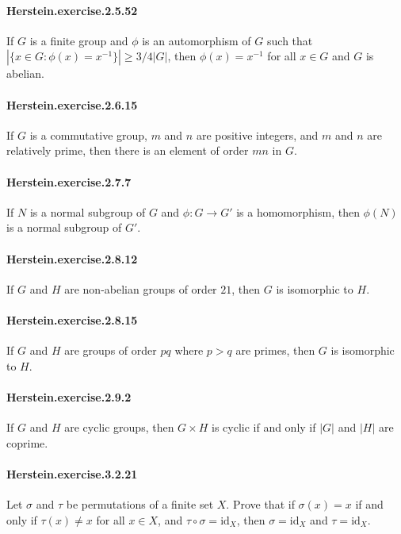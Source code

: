 \documentclass{article}
\begin{document}
\paragraph{Herstein.exercise.2.5.52} If $G$ is a finite group and $\phi$ is an automorphism of $G$ such that $|\{x\in G: \phi(x)=x^{-1}\}|\geq 3/4|G|$, then $\phi(x)=x^{-1}$ for all $x\in G$ and $G$ is abelian.

\paragraph{Herstein.exercise.2.6.15} If $G$ is a commutative group, $m$ and $n$ are positive integers, and $m$ and $n$ are relatively prime, then there is an element of order $mn$ in $G$.

\paragraph{Herstein.exercise.2.7.7} If $N$ is a normal subgroup of $G$ and $\phi:G\to G'$ is a homomorphism, then $\phi(N)$ is a normal subgroup of $G'$.

\paragraph{Herstein.exercise.2.8.12} If $G$ and $H$ are non-abelian groups of order $21$, then $G$ is isomorphic to $H$.

\paragraph{Herstein.exercise.2.8.15} If $G$ and $H$ are groups of order $pq$ where $p>q$ are primes, then $G$ is isomorphic to $H$.

\paragraph{Herstein.exercise.2.9.2} If $G$ and $H$ are cyclic groups, then $G\times H$ is cyclic if and only if $|G|$ and $|H|$ are coprime.

\paragraph{Herstein.exercise.3.2.21} Let $\sigma$ and $\tau$ be permutations of a finite set $X$. Prove that if $\sigma(x)=x$ if and only if $\tau(x)\neq x$ for all $x\in X$, and $\tau\circ\sigma=\mathrm{id}_X$, then $\sigma=\mathrm{id}_X$ and $\tau=\mathrm{id}_X$.
\end{document}
